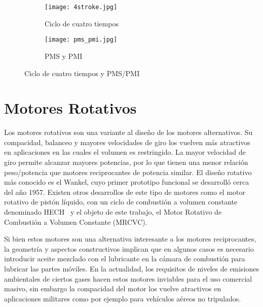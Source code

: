 \begin{figure}
  \centering
  \begin{subfigure}{0.6\textwidth}
    \centering
    \texttt{[image: 4stroke.jpg]}
    \caption{Ciclo de cuatro tiempos}\label{fig:4tiempos}
  \end{subfigure}%
  \hfill
  \begin{subfigure}{0.4\textwidth}
    \centering
    \texttt{[image: pms\_pmi.jpg]}
    \caption{PMS y PMI}\label{fig:pms_pmi}
  \end{subfigure}
  \caption{Ciclo de cuatro tiempos y PMS/PMI}
  \label{fig:4tiempos_pms_pmi} %
\end{figure}


\section{Motores Rotativos}
%
Los motores rotativos son una variante al diseño de los motores alternativos.
%
Su compacidad, balanceo y mayores velocidades de giro los vuelven más atractivos
en aplicaciones en las cuales el volumen es restringido.
%
La mayor velocidad de giro permite alcanzar mayores potencias, por lo que tienen
una menor relación peso/potencia que motores reciprocantes de potencia similar.
%
El diseño rotativo más conocido es el Wankel, cuyo primer prototipo funcional se
desarrolló cerca del año 1957.
%
Existen otros desarrollos de este tipo de motores como el motor rotativo de
pistón líquido, con un ciclo de combustión a volumen constante denominado
HECH~\parencite{hehc_05} y el objeto de este trabajo, el Motor Rotativo de
Combustión a Volumen Constante (MRCVC).

Si bien estos motores son una alternativa interesante a los motores
reciprocantes, la geometría y aspectos constructivos implican que en algunos
casos es necesario introducir aceite mezclado con el lubricante en la cámara de
combustión para lubricar las partes móviles.
%
%
En la actualidad, los requisitos de niveles de emisiones ambientales de ciertos
gases hacen estos motores inviables para el uso comercial masivo, sin embargo la
compacidad del motor los vuelve atractivos en aplicaciones militares como por
ejemplo para vehículos aéreos no tripulados.

